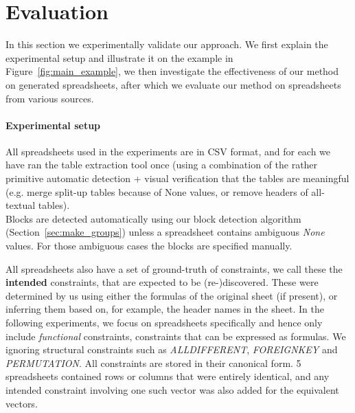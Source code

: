 \newcommand{\runtotal}{16.12}
\newcommand{\runtotalstd}{0.62}

\newcommand{\runfile}{0.50}
\newcommand{\runfilestd}{0.02}

\newcommand{\benchsize}{??}

\section{Evaluation}\label{sec:evaluation}
In this section we experimentally validate our approach.
We first explain the experimental setup and illustrate it on the example in Figure~\ref{fig:main_example}, we then investigate the effectiveness of our method on generated spreadsheets, after which we evaluate our method on spreadsheets from various sources.

\paragraph{Experimental setup}
\label{sec:evalualtion:method}
All spreadsheets used in the experiments are in CSV format, and for each we have ran the table extraction tool once (using a combination of the rather primitive automatic detection + visual verification that the tables are meaningful (e.g. merge split-up tables because of None values, or remove headers of all-textual tables).
 \\ %
Blocks are detected automatically using our block detection algorithm (Section~\ref{sec:make_groups}) unless a spreadsheet contains ambiguous \textit{None} values.
For those ambiguous cases the blocks are specified manually. 


All spreadsheets also have a set of ground-truth of constraints, we call these the \textbf{intended} constraints, that are expected to be (re-)discovered.
These were determined by us using either the formulas of the original sheet (if present), or inferring them based on, for example, the header names in the sheet.
In the following experiments, we focus on spreadsheets specifically and hence only include \textit{functional} constraints, constraints that can be expressed as formulas. We ignoring structural constraints such as \textit{ALLDIFFERENT}, \textit{FOREIGNKEY} and \textit{PERMUTATION}. All constraints are stored in their canonical form. 5 spreadsheets contained rows or columns that were entirely identical, and any intended constraint involving one such vector was also added for the equivalent vectors. 

